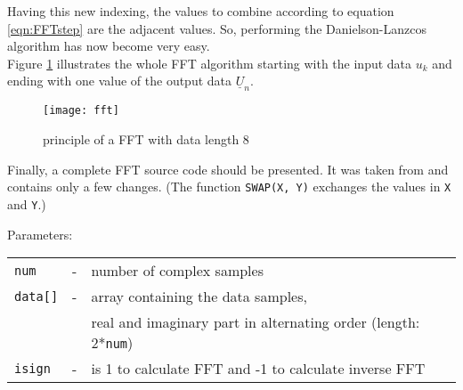 Having this new indexing, the values to combine according to
equation \ref{eqn:FFTstep} are the adjacent values. So, performing
the Danielson-Lanzcos algorithm has now become very easy.\\
Figure \ref{fig:fft} illustrates the whole FFT algorithm starting with the
input data $u_k$ and ending with one value of the output data
$\underline{U}_n$.

\begin{figure}[htb]
\begin{center}
\texttt{[image: fft]}
\end{center}
\caption{principle of a FFT with data length 8}
\label{fig:fft}
\end{figure}
\FloatBarrier

Finally, a complete FFT source code should be presented. It was taken
from \cite{Press} and contains only a
few changes. (The function \texttt{SWAP(X, Y)} exchanges the values in
\texttt{X} and \texttt{Y}.)

\addvspace{12pt}

Parameters:\\
\begin{tabular}{lcl}
\texttt{num}    & - & number of complex samples\\
\texttt{data[]} & - & array containing the data samples,\\
                &   & real and imaginary part in alternating order (length: 2*\texttt{num})\\
\texttt{isign}  & - & is 1 to calculate FFT and -1 to calculate inverse FFT
\end{tabular}

\addvspace{12pt}


